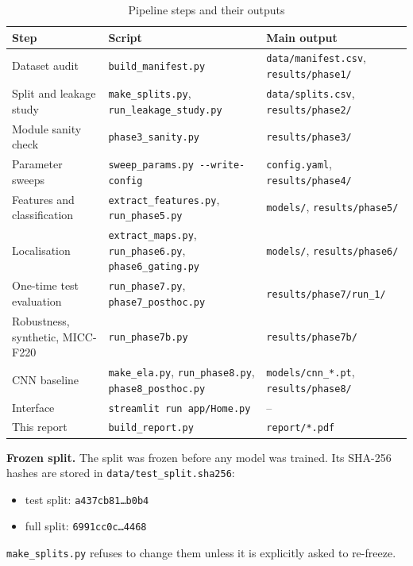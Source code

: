 \begin{table}[h]
\centering
\caption{Pipeline steps and their outputs}\label{tab:repro}
\scriptsize
\begin{tabular}{lll}
\toprule
Step & Script & Main output \\
\midrule
Dataset audit & \texttt{build\_manifest.py} & \texttt{data/manifest.csv}, \texttt{results/phase1/} \\
Split and leakage study & \texttt{make\_splits.py}, \texttt{run\_leakage\_study.py} & \texttt{data/splits.csv}, \texttt{results/phase2/} \\
Module sanity check & \texttt{phase3\_sanity.py} & \texttt{results/phase3/} \\
Parameter sweeps & \texttt{sweep\_params.py -{}-write-config} & \texttt{config.yaml}, \texttt{results/phase4/} \\
Features and classification & \texttt{extract\_features.py}, \texttt{run\_phase5.py} & \texttt{models/}, \texttt{results/phase5/} \\
Localisation & \texttt{extract\_maps.py}, \texttt{run\_phase6.py}, \texttt{phase6\_gating.py} & \texttt{models/}, \texttt{results/phase6/} \\
One-time test evaluation & \texttt{run\_phase7.py}, \texttt{phase7\_posthoc.py} & \texttt{results/phase7/run\_1/} \\
Robustness, synthetic, MICC-F220 & \texttt{run\_phase7b.py} & \texttt{results/phase7b/} \\
CNN baseline & \texttt{make\_ela.py}, \texttt{run\_phase8.py}, \texttt{phase8\_posthoc.py} & \texttt{models/cnn\_*.pt}, \texttt{results/phase8/} \\
Interface & \texttt{streamlit run app/Home.py} & -- \\
This report & \texttt{build\_report.py} & \texttt{report/*.pdf} \\
\bottomrule
\end{tabular}
\end{table}

\textbf{Frozen split.} The split was frozen before any model was trained. Its SHA-256 hashes are stored in
\texttt{data/test\_split.sha256}:
\begin{itemize}\setlength\itemsep{0pt}
\item test split: \texttt{a437cb81\ldots b0b4}
\item full split: \texttt{6991cc0c\ldots 4468}
\end{itemize}
\texttt{make\_splits.py} refuses to change them unless it is explicitly asked to re-freeze.

